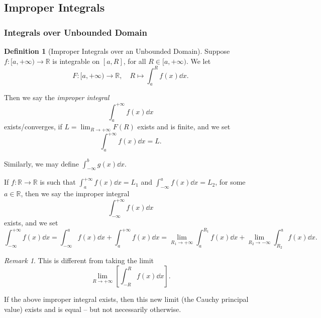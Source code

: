 \documentclass[11pt]{article}
\numberwithin{equation}{section}
\theoremstyle{definition}
\newtheorem{definition}[theorem]{Definition}
\theoremstyle{remark}
\newtheorem{remark}[theorem]{Remark}
\newcommand{\pqty}[1]{\left(#1\right)}
\newcommand{\bqty}[1]{\left[#1\right]}
\newcommand{\ccintv}[2]{[#1,#2]}
\newcommand{\cointv}[2]{[#1,#2)}
\newcommand{\functiondomain}[3]{#1:#2\to #3}
\newcommand{\function}[5]{#1:#2\to #3,\quad #4\mapsto #5}
\newcommand{\RR}{\mathbb R}
\newcommand{\plusinfty}{+\infty}
\newcommand{\minusinfty}{-\infty}
\begin{document}
\subsection{Improper Integrals}

\subsubsection{Integrals over Unbounded Domain}

\begin{definition}[Improper Integrals over an Unbounded Domain]\label{analysis-unit-0178}
    Suppose \(\functiondomain{f}{\cointv{a}{\plusinfty}}{\RR}\) is integrable on \(\ccintv{a}{R}\), for all \(R \in \cointv{a}{\plusinfty}\). We let
    \[
        \function{F}{\cointv{a}{\plusinfty}}{\RR}{R}{\int_{a}^{R} f\pqty{x} \dd{x}}.
    \]

    Then we say the \emph{improper integral}
    \[
        \int_{a}^{\plusinfty} f\pqty{x} \dd{x}
    \]
    exists/converges, if \(L = \lim_{R \to \plusinfty} F\pqty{R}\) exists and is finite, and we set
    \[
        \int_{a}^{\plusinfty} f\pqty{x} \dd{x} = L.
    \]

    Similarly, we may define \(\int_{\minusinfty}^{b} g\pqty{x} \dd{x}\).

    If \(\functiondomain{f}{\RR}{\RR}\) is such that \(\int_{a}^{\plusinfty} f\pqty{x} \dd{x} = L_1\) and \(\int_{\minusinfty}^{a} f\pqty{x} \dd{x} = L_2\), for some \(a \in \RR\), then we say the improper integral
    \[
        \int_{\minusinfty}^{\plusinfty} f\pqty{x} \dd{x}
    \]
    exists, and we set
    \[
        \int_{\minusinfty}^{\plusinfty} f\pqty{x} \dd{x} = \int_{\minusinfty}^{a} f\pqty{x} \dd{x} + \int_{a}^{\plusinfty} f\pqty{x} \dd{x} = \lim_{R_1 \to \plusinfty} \int_{a}^{R_1} f\pqty{x} \dd{x} + \lim_{R_2 \to \minusinfty} \int_{R_2}^{a} f\pqty{x} \dd{x}.
    \]
\end{definition}

\begin{remark}\label{analysis-unit-0179}
    This is different from taking the limit
    \[
        \lim_{R \to \plusinfty} \bqty{\int_{-R}^{R} f\pqty{x} \dd{x}}.
    \]

    If the above improper integral exists, then this new limit (the Cauchy principal value) exists and is equal -- but not necessarily otherwise.
\end{remark}
\end{document}

